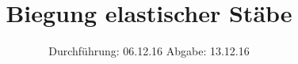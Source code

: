 

\subject{V103}
\title{Biegung elastischer Stäbe}
\date{
  Durchführung: 06.12.16
  \hspace{3em}
  Abgabe: 13.12.16
}



\maketitle
\thispagestyle{empty}
\tableofcontents
\newpage






\printbibliography


